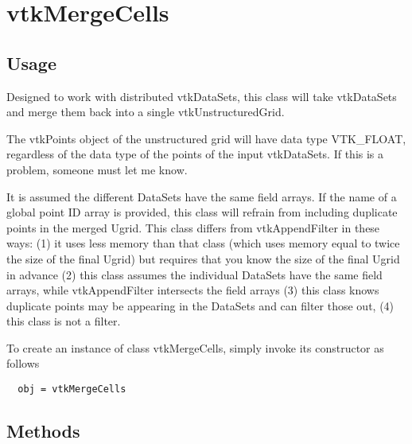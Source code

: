\section{vtkMergeCells}

\subsection{Usage}

    Designed to work with distributed vtkDataSets, this class will take
    vtkDataSets and merge them back into a single vtkUnstructuredGrid.

    The vtkPoints object of the unstructured grid will have data type
    VTK\_FLOAT, regardless of the data type of the points of the
    input vtkDataSets.  If this is a problem, someone must let me know.

    It is assumed the different DataSets have the same field arrays.  If
    the name of a global point ID array is provided, this class will
    refrain from including duplicate points in the merged Ugrid.  This
    class differs from vtkAppendFilter in these ways: (1) it uses less
    memory than that class (which uses memory equal to twice the size
    of the final Ugrid) but requires that you know the size of the
    final Ugrid in advance (2) this class assumes the individual DataSets have
    the same field arrays, while vtkAppendFilter intersects the field
    arrays (3) this class knows duplicate points may be appearing in
    the DataSets and can filter those out, (4) this class is not a filter.

To create an instance of class vtkMergeCells, simply
invoke its constructor as follows
\begin{verbatim}
  obj = vtkMergeCells
\end{verbatim}
\subsection{Methods}

